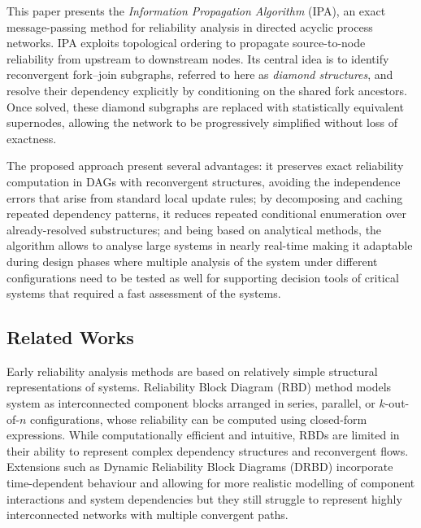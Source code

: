 \documentclass[preprint,12pt]{elsarticle}
\begin{document}
This paper presents the \emph{Information Propagation Algorithm} (IPA), an exact message-passing method for reliability analysis in directed acyclic process networks. IPA exploits topological ordering to propagate source-to-node reliability from upstream to downstream nodes. Its central idea is to identify reconvergent fork--join subgraphs, referred to here as \emph{diamond structures}, and resolve their dependency explicitly by conditioning on the shared fork ancestors. Once solved, these diamond subgraphs are replaced with statistically equivalent supernodes, allowing the network to be progressively simplified without loss of exactness.

The proposed approach present several advantages: it preserves exact reliability computation in DAGs with reconvergent structures, avoiding the independence errors that arise from standard local update rules; by decomposing and caching repeated dependency patterns, it reduces repeated conditional enumeration over already-resolved substructures; and being based on analytical methods, the algorithm allows to analyse large systems in nearly real-time making it adaptable during design phases where multiple analysis of the system under different configurations need to be tested as well for supporting decision tools of critical systems that required a fast assessment of the systems.   


\subsection{Related Works}\label{subsec:relatedworks}

Early reliability analysis methods are based on relatively  simple structural representations of systems. Reliability Block Diagram (RBD)\cite{billinton_network_1992,rausand_m_2014_reliability_2014,ebeling_introduction_2019} method models system as interconnected component blocks arranged in series, parallel, or $k$-out-of-$n$ configurations, whose reliability can be computed using closed-form expressions. 
 While computationally efficient and intuitive, RBDs are limited in their ability to represent complex dependency structures and reconvergent flows. Extensions such as Dynamic Reliability Block Diagrams (DRBD) \cite{distefano_dynamic_2007} incorporate time-dependent behaviour and allowing for more realistic modelling of component interactions and system dependencies but they still struggle to represent highly interconnected networks with multiple convergent paths.
\end{document}
